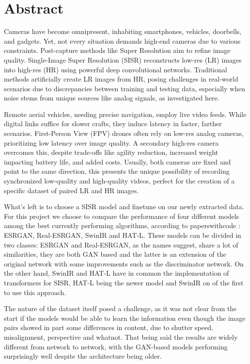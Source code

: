 \chapter*{Abstract}
\label{abstract}

Cameras have become omnipresent, inhabiting smartphones, vehicles, doorbells, and gadgets. Yet, not every situation demands high-end cameras due to various constraints. Post-capture methods like Super Resolution aim to refine image quality. Single-Image Super Resolution (SISR) reconstructs low-res (LR) images into high-res (HR) using powerful deep convolutional networks. Traditional methods artificially create LR images from HR, posing challenges in real-world scenarios due to discrepancies between training and testing data, especially when noise stems from unique sources like analog signals, as investigated here.

Remote aerial vehicles, needing precise navigation, employ live video feeds. While digital links suffice for slower crafts, they induce latency in faster, farther scenarios. First-Person View (FPV) drones often rely on low-res analog cameras, prioritizing low latency over image quality. A secondary high-res camera overcomes this, despite trade-offs like agility reduction, increased weight impacting battery life, and added costs. Usually, both cameras are fixed and point to the same direction, this presents the unique possibility of recording synchronized low-quality and high-quality videos, perfect for the creation of a specific dataset of paired LR and HR images.

What's left is to choose a SISR model and finetune on our newly extracted data. For this project we choose to compare the performance of four different models among the best currently performing algorithms, according to paperswithcode \cite{pwcode}: ESRGAN\cite{wang2018esrgan}, Real-ESRGAN\cite{wang2021realesrgan}, SwinIR\cite{liang2021swinir} and HAT-L\cite{chen2023activating}. These models can be divided in two classes: ESRGAN and Real-ESRGAN, as the names suggest, share a lot of similarities, they are both GAN based and the latter is an extension of the original network with some improvements such as the discriminator network. On the other hand, SwinIR and HAT-L have in common the implementation of transformers for SISR, HAT-L being the newer model and SwinIR on of the first to use this approach.

The nature of the dataset itself posed a challenge, as it was not clear from the start if the models would be able to learn the information even though the image pairs showed in part some differences in content, due to shutter speed, misalignment, perspective and whatnot. That being said the results are widely different from network to network, with the GAN-based models performing surprisingly well despite the architecture being older.

